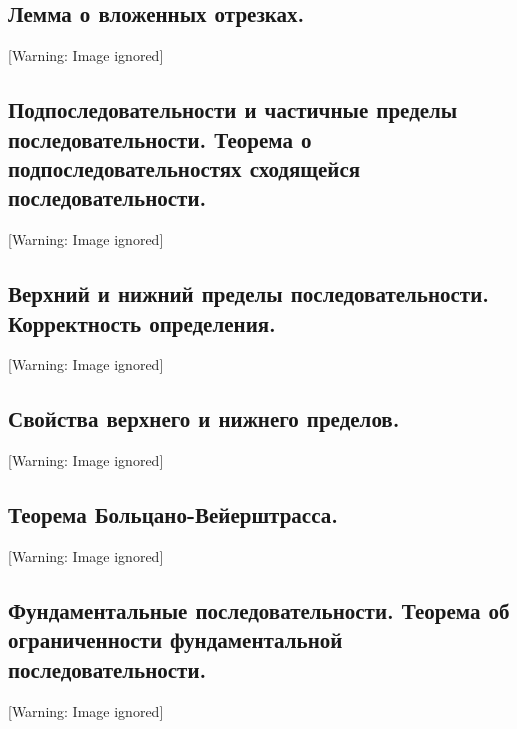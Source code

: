 \documentclass[a4paper]{article}
\begin{document}
\subsection{Лемма о вложенных отрезках.}
  [Warning: Image ignored] %
 

\subsection{Подпоследовательности и частичные пределы последовательности. Теорема о подпоследовательностях сходящейся
последовательности. }
  [Warning: Image ignored] %
 

\subsection{Верхний и нижний пределы последовательности. Корректность определения. }
  [Warning: Image ignored] %
 

\subsection{Свойства верхнего и нижнего пределов.}
  [Warning: Image ignored] %
 

\subsection[Теорема Больцано{}-Вейерштрасса.]{Теорема Больцано-Вейерштрасса.}
  [Warning: Image ignored] %
 

\subsection{Фундаментальные последовательности. Теорема об ограниченности фундаментальной последовательности. \ }
  [Warning: Image ignored] %
 
\end{document}
